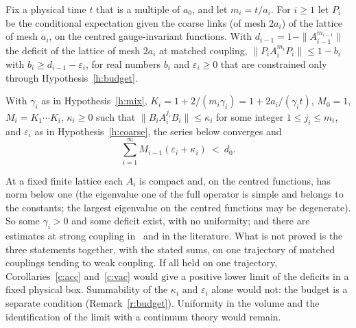 \begin{hypothesis}\label{h:coarse}
Fix a physical time $t$ that is a multiple of $a_0$, and let $m_i=t/a_i$. For $i\ge1$ let $P_i$ be the conditional
expectation given the coarse links (of mesh $2a_i$) of the lattice of mesh $a_i$, on the centred gauge-invariant functions. With $d_{i-1}=1-\|A_{i-1}^{m_{i-1}}\|$
the deficit of the lattice of mesh $2a_i$ at matched coupling, $\|P_iA_i^{m_i}P_i\|\le1-b_i$ with
$b_i\ge d_{i-1}-\varepsilon_i$, for real numbers $b_i$ and $\varepsilon_i\ge0$ that are constrained only through
Hypothesis~\ref{h:budget}.
\end{hypothesis}

\begin{hypothesis}\label{h:budget}
With $\gamma_i$ as in Hypothesis~\ref{h:mix}, $K_i=1+2/(m_i\gamma_i)=1+2a_i/(\gamma_it)$, $M_0=1$, $M_i=K_1\cdots K_i$, $\kappa_i\ge0$ such
that $\|B_iA_i^{j_i}B_i\|\le\kappa_i$ for some integer $1\le j_i\le m_i$, and $\varepsilon_i$ as in
Hypothesis~\ref{h:coarse}, the series below converges and
\[
\sum_{i=1}^\infty M_{i-1}(\varepsilon_i+\kappa_i)\ <\ d_0 .
\]
\end{hypothesis}

At a fixed finite lattice each $A_i$ is compact and, on the centred functions, has norm below one (the eigenvalue
one of the full operator is simple and belongs to the constants; the largest eigenvalue on the centred
functions may be degenerate). So some $\gamma_i>0$ and some deficit exist, with no uniformity; and there are estimates at strong coupling in~\cite{RepoInh} and in the literature. What is
not proved is the three statements together, with the stated sums, on one trajectory of matched couplings
tending to weak coupling. If all held on one trajectory, Corollaries~\ref{c:acc} and~\ref{c:vac} would give a positive lower limit of the deficits in a
fixed physical box. Summability of the $\kappa_i$ and $\varepsilon_i$ alone would not: the budget is a
separate condition (Remark~\ref{r:budget}). Uniformity in the volume and the identification of the limit with
a continuum theory would remain.


